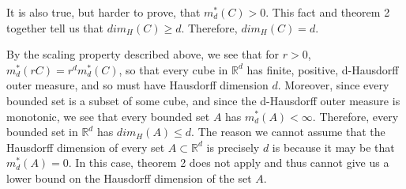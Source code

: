   It is also true, but harder to prove, that $m_d^*(C)>0$. This fact and
  theorem 2 together tell us that $dim_H(C) \geq d$. Therefore, $dim_H(C)=d$.
  
  By the scaling property described above, we see that for $r>0$,
  $m_d^*(rC)=r^{d}m_d^*(C)$, so that every cube in $\mathbb{R}^d$ has finite,
  positive, d-Hausdorff outer measure, and so must have Hausdorff dimension
  $d$. Moreover, since every bounded set is a subset of some cube, and since
  the d-Hausdorff outer measure is monotonic, we see that every bounded set $A$
  has $m_d^*(A)<\infty$. Therefore, every bounded set in $\mathbb{R}^d$ has
  $dim_H(A) \leq d$. The reason we cannot assume that the Hausdorff dimension
  of every set $A \subset \mathbb{R}^d$ is precisely $d$ is because it may be
  that $m_d^*(A)=0$. In this case, theorem 2 does not apply and thus cannot
  give us a lower bound on the Hausdorff dimension of the set $A$.

  
